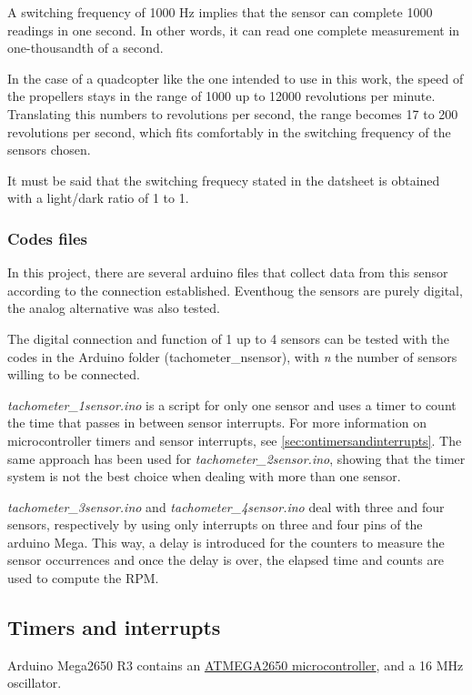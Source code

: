 \documentclass[a4paper]{article}
\begin{document}
A switching frequency of 1000 Hz implies that the sensor can complete 1000 readings in one second. In other words, it can read one complete measurement in one-thousandth of a second.

In the case of a quadcopter like the one intended to use in this work, the speed of the propellers stays in the range of 1000 up to 12000 revolutions per minute. Translating this numbers to revolutions per second, the range becomes 17 to 200 revolutions per second, which fits comfortably in the switching frequency of the sensors chosen.

It must be said that the switching frequecy stated in the datsheet is obtained with a light/dark ratio of 1 to 1.


\subsubsection{Codes files}
In this project, there are several arduino files that collect data from this sensor according to the connection established. Eventhoug the sensors are purely digital, the analog alternative was also tested.



The digital connection and function of 1 up to 4 sensors can be tested with the codes in the Arduino folder (tachometer\_nsensor), with \textit{n} the number of sensors willing to be connected.

\textit{tachometer\_1sensor.ino} is a script for only one sensor and uses a timer to count the time that passes in between sensor interrupts. For more information on microcontroller timers and sensor interrupts, see \autoref{sec:ontimersandinterrupts}. The same approach has been used for \textit{tachometer\_2sensor.ino}, showing that the timer system is not the best choice when dealing with more than one sensor.

\textit{tachometer\_3sensor.ino} and \textit{tachometer\_4sensor.ino} deal with three and four sensors, respectively by using only interrupts on three and four pins of the arduino Mega. This way, a delay is introduced for the counters to measure the sensor occurrences and once the delay is over, the elapsed time and counts are used to compute the RPM.


\subsection{Timers and interrupts}
\label{sec:ontimersandinterrupts}

Arduino Mega2650 R3 contains an \hyperref{https://ww1.microchip.com/downloads/en/devicedoc/atmel-2549-8-bit-avr-microcontroller-atmega640-1280-1281-2560-2561_datasheet.pdf}{category}{name}{ATMEGA2650 microcontroller}, and a 16 MHz oscillator.
\end{document}
